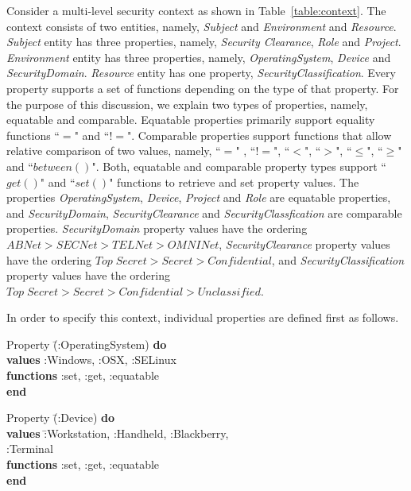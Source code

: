 Consider a multi-level security context as shown in Table~\ref{table:context}. The context consists of two entities, namely, {\em Subject} and {\em Environment} and {\em Resource}. {\em Subject} entity has three properties, namely, {\em Security Clearance}, {\em Role} and {\em Project}. {\em Environment} entity has three properties, namely, {\em OperatingSystem}, {\em Device} and {\em SecurityDomain}. {\em Resource} entity has one property, {\em SecurityClassification}. Every property supports a set of functions depending on the type of that property. For the purpose of this discussion, we explain two types of properties, namely, equatable and comparable. Equatable properties primarily support equality functions  ``$=$" and ``$!=$". Comparable properties support functions that allow relative comparison of two values, namely, ``$=$" , ``$!=$", ``$<$", ``$>$",  ``$\leq$", ``$\geq$" and ``$between()$". Both, equatable and comparable property types support ``$get()$" and ``$set()$" functions to retrieve and set property values. The properties {\em OperatingSystem}, {\em Device}, {\em Project} and {\em Role} are equatable properties, and {\em SecurityDomain}, {\em SecurityClearance} and {\em SecurityClassfication} are comparable properties. {\em SecurityDomain} property values have the ordering $ABNet > SECNet > TELNet > OMNINet$,  {\em SecurityClearance} property values have the ordering $Top\;Secret > Secret > Confidential$, and {\em SecurityClassification} property values have the ordering $Top\;Secret > Secret > Confidential > Unclassified$. 

In order to specify this context, individual properties are defined first as follows. 

\begin{tabbing}
             Property \= (:OperatingSystem) {\bf do} \\
\>	   {\bf values}  :Windows, :OSX,  :SELinux\\
\>	   {\bf functions}   :set, :get, :equatable \\
	{\bf end} 
\end{tabbing}
	
\begin{tabbing}
 Property \= (:Device) {\bf do} \\
\>	 {\bf values} \= :Workstation, :Handheld, :Blackberry, \\
\>\>      :Terminal\\
\>	 {\bf functions}  :set, :get, :equatable \\
	 {\bf end}
\end{tabbing}

